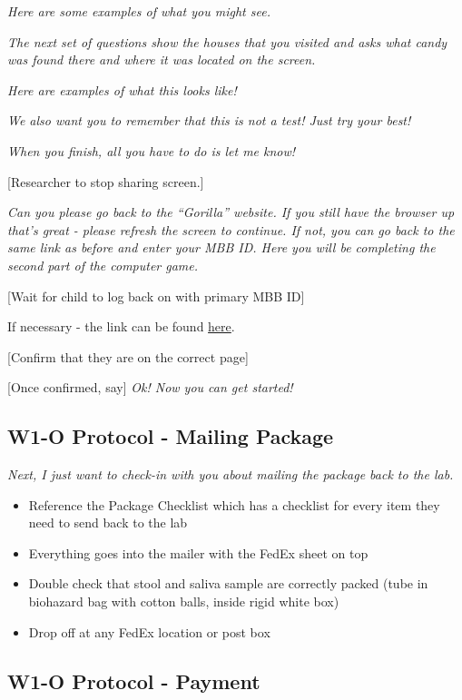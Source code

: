 \documentclass[]{book}
\providecommand{\tightlist}{%
  \setlength{\itemsep}{0pt}\setlength{\parskip}{0pt}}
\begin{document}
\emph{Here are some examples of what you might see.}

\emph{The next set of questions show the houses that you visited and asks what candy was found there and where it was located on the screen.}

\emph{Here are examples of what this looks like!}

\emph{We also want you to remember that this is not a test! Just try your best!}

\emph{When you finish, all you have to do is let me know!}

{[}Researcher to stop sharing screen.{]}

\emph{Can you please go back to the ``Gorilla'' website. If you still have the browser up that's great - please refresh the screen to continue. If not, you can go back to the same link as before and enter your MBB ID. Here you will be completing the second part of the computer game.}

{[}Wait for child to log back on with primary MBB ID{]}

If necessary - the link can be found \href{https://research.sc/participant/login/20451/publicid}{here}.

{[}Confirm that they are on the correct page{]}

{[}Once confirmed, say{]} \emph{Ok! Now you can get started!}

\hypertarget{w1-o-protocol---mailing-package}{%
\subsection{W1-O Protocol - Mailing Package}\label{w1-o-protocol---mailing-package}}

\emph{Next, I just want to check-in with you about mailing the package back to the lab.}

\begin{itemize}
\tightlist
\item
  Reference the Package Checklist which has a checklist for every item they need to send back to the lab
\item
  Everything goes into the mailer with the FedEx sheet on top
\item
  Double check that stool and saliva sample are correctly packed (tube in biohazard bag with cotton balls, inside rigid white box)
\item
  Drop off at any FedEx location or post box
\end{itemize}

\hypertarget{w1-o-protocol---payment}{%
\subsection{W1-O Protocol - Payment}\label{w1-o-protocol---payment}}
\end{document}
